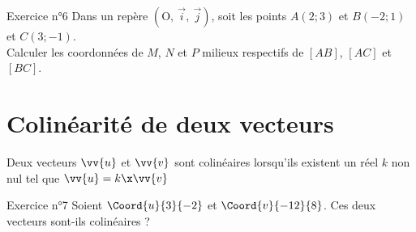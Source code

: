 \documentclass[12pt,a4paper]{article}
\def\Oij{$\left(\text{O},~\vec{i},~\vec{j}\right)$}
\begin{document}
\begin{mybox}{Exercice n°6}
Dans un repère \Oij{}, soit les points $A(2;3)$ et $B(-2; 1)$ et $C(3;-1)$.\\
Calculer les coordonnées de $M$, $N$ et $P$ milieux respectifs de $[AB]$, $[AC]$ et $[BC]$.
\end{mybox}

\begin{framed}
\vspace{3cm}
\end{framed}


\section{Colinéarité de deux vecteurs}

\begin{defi}
Deux vecteurs $\vv{u}$ et $\vv{v}$ sont colinéaires lorsqu'ils existent un réel $k$ non nul tel que $\vv{u}=k\x\vv{v}$
\end{defi}


\begin{center}
    

\end{center}

\begin{mybox}{Exercice n°7}
Soient $\Coord{u}{3}{-2}$ et $\Coord{v}{-12}{8}$.
Ces deux vecteurs sont-ils colinéaires ?
\end{mybox}

\begin{framed}
\vspace{3cm}
\end{framed}
\end{document}

